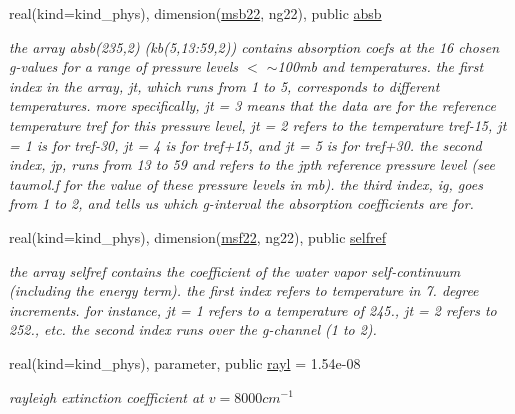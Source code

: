 \begin{Indent}
\begin{DoxyCompactItemize}
real(kind=kind\+\_\+phys), dimension(\hyperlink{group__module__radsw__kgbnn_ga3398f8d12ec0349b44197873ac58fd98}{msb22}, ng22), public \hyperlink{group__module__radsw__kgbnn_ga60403e7d343c85e965f3507b0db0f2a5}{absb}
\begin{DoxyCompactList}\small\item\em the array absb(235,2) (kb(5,13\+:59,2)) contains absorption coefs at the 16 chosen g-\/values for a range of pressure levels $<$ $\sim$100mb and temperatures. the first index in the array, jt, which runs from 1 to 5, corresponds to different temperatures. more specifically, jt = 3 means that the data are for the reference temperature tref for this pressure level, jt = 2 refers to the temperature tref-\/15, jt = 1 is for tref-\/30, jt = 4 is for tref+15, and jt = 5 is for tref+30. the second index, jp, runs from 13 to 59 and refers to the jpth reference pressure level (see taumol.\+f for the value of these pressure levels in mb). the third index, ig, goes from 1 to 2, and tells us which g-\/interval the absorption coefficients are for. \end{DoxyCompactList}\item 
real(kind=kind\+\_\+phys), dimension(\hyperlink{group__module__radsw__kgbnn_ga0903a020c9e4a4f7c21911d2ab98fd46}{msf22}, ng22), public \hyperlink{group__module__radsw__kgbnn_gabc3bd99e8ad7d1f09fb7fab7ed67a32b}{selfref}
\begin{DoxyCompactList}\small\item\em the array selfref contains the coefficient of the water vapor self-\/continuum (including the energy term). the first index refers to temperature in 7. degree increments. for instance, jt = 1 refers to a temperature of 245., jt = 2 refers to 252., etc. the second index runs over the g-\/channel (1 to 2). \end{DoxyCompactList}\item 
real(kind=kind\+\_\+phys), parameter, public \hyperlink{group__module__radsw__kgbnn_gae77b766677ea476e2ba14b88e511870a}{rayl} = 1.\+54e-\/08
\begin{DoxyCompactList}\small\item\em rayleigh extinction coefficient at $v=8000cm^{-1}$ \end{DoxyCompactList}\end{DoxyCompactItemize}
\end{Indent}
